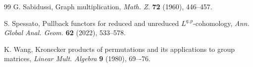 \documentclass{amsart}
\theoremstyle{definition}
\numberwithin{equation}{section}
\begin{document}
\begin{thebibliography}{99}
 G. Sabidussi, Graph multiplication, \textit{Math. Z.} \textbf{72}  (1960), 446--457. 



 S. Spessato, Pullback functors for reduced and unreduced $L^{q,p}$-cohomology,
\textit{Ann. Global Anal. Geom.} \textbf{62} (2022), 533--578. 







 K. Wang, Kronecker products of permutations and its applications to group matrices, \textit{Linear Mult. Algebra} \textbf{9}  (1980), 69–-76.






\end{thebibliography}
\end{document}
